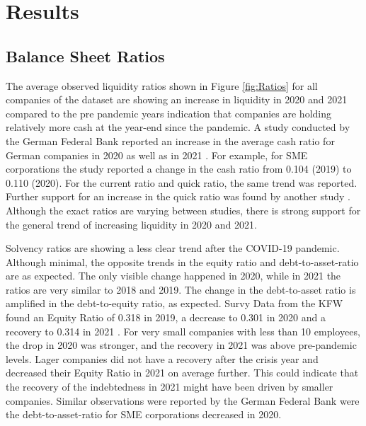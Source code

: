 
\chapter{Results} %

\label{Chapter5} %


\section{Balance Sheet Ratios}
\label{BSratio}

The average observed liquidity ratios shown in Figure \ref{fig:Ratios} for all companies of the dataset are showing an increase in liquidity in 2020 and 2021 compared to the pre pandemic years indication that companies are holding relatively more cash at the year-end since the pandemic. A study conducted by the German Federal Bank reported an increase in the average cash ratio for German companies in 2020 as well as in 2021 \parencite{deutsche_bundesbank_jahresabschlussstatistik_2022}. For example, for SME corporations the study reported a change in the cash ratio from 0.104 (2019) to 0.110 (2020). For the current ratio and quick ratio, the same trend was reported. Further support for an increase in the quick ratio was found by another study \parencite{bley_mittelstand_2022}. Although the exact ratios are varying between studies, there is strong support for the general trend of increasing liquidity in 2020 and 2021.

Solvency ratios are showing a less clear trend after the COVID-19 pandemic. Although minimal, the opposite trends in the equity ratio and debt-to-asset-ratio are as expected. The only visible change happened in 2020, while in 2021 the ratios are very similar to 2018 and 2019. The change in the debt-to-asset ratio is amplified in the debt-to-equity ratio, as expected. Survy Data from the KFW found an Equity Ratio of 0.318 in 2019, a decrease to 0.301 in 2020 and a recovery to 0.314 in 2021 \parencite{kfw_kfw-mittelstandspanel_2022}. For very small companies with less than 10 employees, the drop in 2020 was stronger, and the recovery in 2021 was above pre-pandemic levels. Lager companies did not have a recovery after the crisis year and decreased their Equity Ratio in 2021 on average further. This could indicate that the recovery of the indebtedness in 2021 might have been driven by smaller companies. Similar observations were reported by the German Federal Bank were the debt-to-asset-ratio for SME corporations decreased in 2020.


